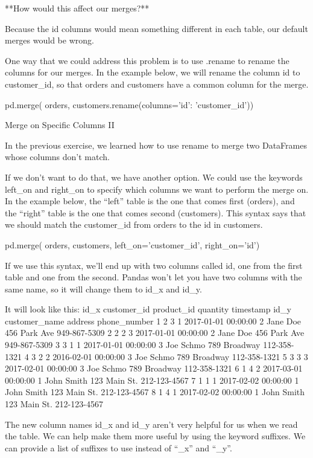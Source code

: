 \documentclass{journal}
\begin{document}
**How would this affect our merges?**

Because the id columns would mean something different in each table, our default merges would be wrong.

One way that we could address this problem is to use .rename to rename the columns for our merges. In the example below, we will rename the column id to customer_id, so that orders and customers have a common column for the merge.

pd.merge(
    orders,
    customers.rename(columns={'id': 'customer_id'}))

Merge on Specific Columns II

In the previous exercise, we learned how to use rename to merge two DataFrames whose columns don’t match.

If we don’t want to do that, we have another option. We could use the keywords left_on and right_on to specify which columns we want to perform the merge on. In the example below, the “left” table is the one that comes first (orders), and the “right” table is the one that comes second (customers). This syntax says that we should match the customer_id from orders to the id in customers.

pd.merge(
    orders,
    customers,
    left_on='customer_id',
    right_on='id')

If we use this syntax, we’ll end up with two columns called id, one from the first table and one from the second. Pandas won’t let you have two columns with the same name, so it will change them to id_x and id_y.

It will look like this:
id_x 	customer_id 	product_id 	quantity 	timestamp 	id_y 	customer_name 	address 	phone_number
1 	2 	3 	1 	2017-01-01 00:00:00 	2 	Jane Doe 	456 Park Ave 	949-867-5309
2 	2 	2 	3 	2017-01-01 00:00:00 	2 	Jane Doe 	456 Park Ave 	949-867-5309
3 	3 	1 	1 	2017-01-01 00:00:00 	3 	Joe Schmo 	789 Broadway 	112-358-1321
4 	3 	2 	2 	2016-02-01 00:00:00 	3 	Joe Schmo 	789 Broadway 	112-358-1321
5 	3 	3 	3 	2017-02-01 00:00:00 	3 	Joe Schmo 	789 Broadway 	112-358-1321
6 	1 	4 	2 	2017-03-01 00:00:00 	1 	John Smith 	123 Main St. 	212-123-4567
7 	1 	1 	1 	2017-02-02 00:00:00 	1 	John Smith 	123 Main St. 	212-123-4567
8 	1 	4 	1 	2017-02-02 00:00:00 	1 	John Smith 	123 Main St. 	212-123-4567

The new column names id_x and id_y aren’t very helpful for us when we read the table. We can help make them more useful by using the keyword suffixes. We can provide a list of suffixes to use instead of “_x” and “_y”.
\end{document}

